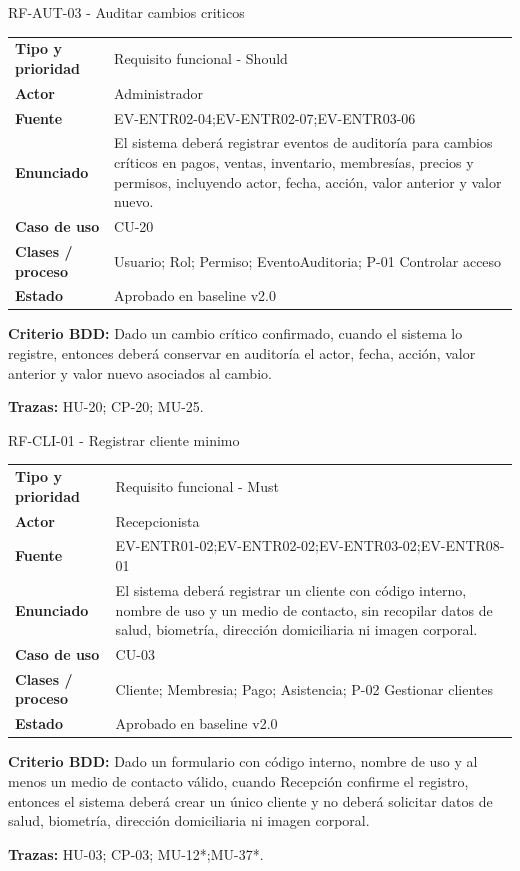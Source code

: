 \begin{reqbox}{RF-AUT-03 - Auditar cambios criticos}
\begin{tabularx}{\textwidth}{>{\bfseries}p{3.2cm}Y}
Tipo y prioridad & Requisito funcional - Should \\
Actor & Administrador \\
Fuente & EV-ENTR02-04;EV-ENTR02-07;EV-ENTR03-06 \\
Enunciado & El sistema deberá registrar eventos de auditoría para cambios críticos en pagos, ventas, inventario, membresías, precios y permisos, incluyendo actor, fecha, acción, valor anterior y valor nuevo. \\
Caso de uso & CU-20 \\
Clases / proceso & Usuario; Rol; Permiso; EventoAuditoria; P-01 Controlar acceso \\
Estado & Aprobado en baseline v2.0 \\
\end{tabularx}
\textbf{Criterio BDD:} Dado un cambio crítico confirmado, cuando el sistema lo registre, entonces deberá conservar en auditoría el actor, fecha, acción, valor anterior y valor nuevo asociados al cambio.

\textbf{Trazas:} HU-20; CP-20; MU-25.
\end{reqbox}


\begin{reqbox}{RF-CLI-01 - Registrar cliente minimo}
\begin{tabularx}{\textwidth}{>{\bfseries}p{3.2cm}Y}
Tipo y prioridad & Requisito funcional - Must \\
Actor & Recepcionista \\
Fuente & EV-ENTR01-02;EV-ENTR02-02;EV-ENTR03-02;EV-ENTR08-01 \\
Enunciado & El sistema deberá registrar un cliente con código interno, nombre de uso y un medio de contacto, sin recopilar datos de salud, biometría, dirección domiciliaria ni imagen corporal. \\
Caso de uso & CU-03 \\
Clases / proceso & Cliente; Membresia; Pago; Asistencia; P-02 Gestionar clientes \\
Estado & Aprobado en baseline v2.0 \\
\end{tabularx}
\textbf{Criterio BDD:} Dado un formulario con código interno, nombre de uso y al menos un medio de contacto válido, cuando Recepción confirme el registro, entonces el sistema deberá crear un único cliente y no deberá solicitar datos de salud, biometría, dirección domiciliaria ni imagen corporal.

\textbf{Trazas:} HU-03; CP-03; MU-12*;MU-37*.
\end{reqbox}


